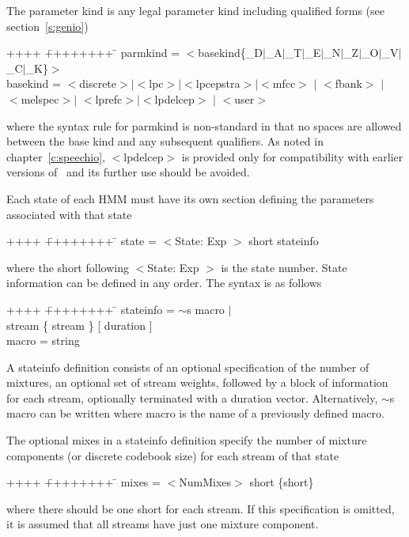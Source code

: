 The parameter kind is any legal parameter kind including qualified forms
(see section~\ref{s:genio})
{\sf
\begin{tabbing}
++++ \= ++++++++ \=  \kill
\>  parmkind =\> $<$basekind\{\_D$|$\_A$|$\_T$|$\_E$|$\_N$|$\_Z$|$\_O$|$\_V$|$\_C$|$\_K\}$>$ \\
\>  basekind =\> $<$discrete$>$$|$$<$lpc$>$$|$$<$lpcepstra$>$$|$$<$mfcc$>$ $|$ $<$fbank$>$ $|$ \\
 \> \>          $<$melspec$>$$|$ $<$lprefc$>$$|$$<$lpdelcep$>$ $|$ $<$user$>$ 
\end{tabbing}
}
\noindent
where the syntax rule for {\sf parmkind} is non-standard in that no spaces
are allowed between the base kind and any subsequent qualifiers.
As noted in chapter~\ref{c:speechio}, {\sf $<$lpdelcep$>$} is 
provided only for compatibility
with earlier versions of \HTK\ and its further use should be avoided.

Each state of each HMM must have its own section defining the parameters
associated with that state
{\sf
\begin{tabbing}
++++ \= ++++++++ \=  \kill
\> state =\>  $<$State: Exp $>$ short stateinfo
\end{tabbing}
}
\noindent
where the  short following {\sf $<$State: Exp $>$} is the state number.  State
information can be defined in any order.  The syntax is as follows
{\sf
\begin{tabbing}
++++ \= ++++++++ \=  \kill
\>   stateinfo = \> $\sim$s macro $|$ \\
  \>\>              [ mixes ] [ weights ] stream \{ stream \} [ duration ] \\
\>   macro     = \> string
\end{tabbing}
}
\noindent
A {\sf stateinfo} definition consists of an 
optional specification of the number of mixtures, an optional set of stream weights,
followed by a block of information for each stream, optionally terminated with
a duration vector.  Alternatively, {\sf $\sim$s macro} can be
written where {\sf macro} is the name of a previously defined macro.

The optional {\sf mixes} in a {\sf stateinfo} definition specify
the number of mixture components (or discrete codebook size) for 
each stream of that state
{\sf
\begin{tabbing}
++++ \= ++++++++ \=  \kill
\>   mixes = \>  $<$NumMixes$>$ short \{short\}
\end{tabbing}
}
\noindent
where there should be one {\sf short} for each stream.  If this
specification is omitted, it is assumed that all streams
have just one mixture component.


